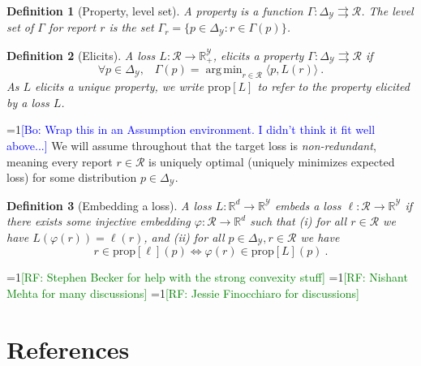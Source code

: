 \documentclass{article}
\newtheorem{definition}{Definition}
\newcommand{\Comments}{1}
\newcommand{\mynote}[2]{\ifnum\Comments=1\textcolor{#1}{#2}\fi}
\newcommand{\raf}[1]{\mynote{green}{[RF: #1]}}
\newcommand{\bo}[1]{\mynote{blue}{[Bo: #1]}}
\DeclareMathOperator*{\argmin}{arg\,min}
\newcommand{\reals}{\mathbb{R}}
\newcommand{\prop}[1]{\mathrm{prop}[#1]}
\newcommand{\simplex}{\Delta_\Y}
\newcommand{\R}{\mathcal{R}}
\newcommand{\Y}{\mathcal{Y}}
\newcommand{\inprod}[2]{\langle #1, #2 \rangle}%
\newcommand{\toto}{\rightrightarrows}
\begin{document}
\begin{definition}[Property, level set]\label{def:property}
  A \emph{property} is a function $\Gamma:\simplex\toto\R$.
  The \emph{level set} of $\Gamma$ for report $r$ is the set $\Gamma_r = \{p \in \simplex : r \in \Gamma(p)\}$.
\end{definition}

\begin{definition}[Elicits]
  \label{def:elicits}
  A loss $L:\R\to\reals^\Y_+$, \emph{elicits} a property $\Gamma:\simplex \toto \R$ if
  \begin{equation}
    \forall p\in\simplex,\;\;\;\Gamma(p) = \argmin_{r \in \R} \inprod{p}{L(r)}~.
  \end{equation}
  As $L$ elicits a unique property, we write $\prop{L}$ to refer to the property elicited by a loss $L$.
\end{definition}

\bo{Wrap this in an Assumption environment. I didn't think it fit well above...} We will assume throughout that the target loss is \emph{non-redundant}, meaning every report $r \in \R$ is uniquely optimal (uniquely minimizes expected loss) for some distribution $p\in\simplex$.

\begin{definition}[Embedding a loss]\label{def:loss-embed}
  A loss $L:\reals^d\to\reals^\Y$ \emph{embeds} a loss $\ell:\R\to\reals^\Y$ if there exists some injective embedding $\varphi:\R\to\reals^d$ such that
  (i) for all $r\in\R$ we have $L(\varphi(r)) = \ell(r)$, and (ii) for all $p\in\simplex,r\in\R$ we have
  \begin{equation}\label{eq:embed-loss}
    r \in \prop{\ell}(p) \iff \varphi(r) \in \prop{L}(p)~.
  \end{equation}
\end{definition}









\begin{ack}
  \raf{Stephen Becker for help with the strong convexity stuff}
  \raf{Nishant Mehta for many discussions}
  \raf{Jessie Finocchiaro for discussions}
\end{ack}

\section*{References}
\end{document}
